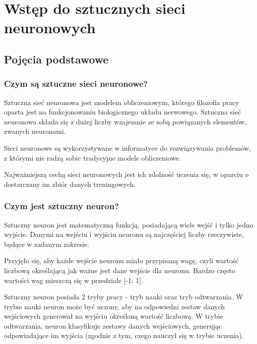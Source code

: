 \chapter{Wstęp do sztucznych sieci neuronowych}
\section{Pojęcia podstawowe}
\subsection{Czym są sztuczne sieci neuronowe?}
Sztuczna sieć neuronowa jest modelem obliczeniowym, którego filozofia pracy oparta jest na funkcjonowaniu biologicznego układu nerwowego.
Sztuczna sieć neuronowa składa się z dużej liczby wzajemnie ze sobą powiązanych elementów, zwanych neuronami.

Sieci neuronowe są wykorzystywane w informatyce do rozwiązywania problemów, z którymi nie radzą sobie tradycyjne modele obliczeniowe.

Najważniejszą cechą sieci neuronowych jest ich zdolność uczenia się, w oparciu o dostarczany im zbiór danych treningowych.

\subsection{Czym jest sztuczny neuron?}
Sztuczny neuron jest matematyczną funkcją, posiadającą wiele wejść i tylko jedno wyjście. Danymi na wejściu i wyjściu neuronu są najczęściej liczby rzeczywiste, będące  w zadanym zakresie.

Przyjęło się, aby każde wejście neuronu miało przypisaną wagę, czyli wartość liczbową określającą jak ważne jest dane wejście dla neuronu.
Bardzo często wartości wag mieszczą się w przedziale [-1; 1].

Sztuczny neuron posiada 2 tryby pracy - tryb nauki oraz tryb odtwarzania. \newline
W trybie nauki neuron może być uczony, aby na odpowiedni zestaw danych
wejściowych generował na wyjściu określoną wartość liczbową. \newline
W trybie odtwarzania, neuron klasyfikuje zestawy danych wejściowych, generując
odpowiadające im wyjścia (zgodnie z tym, czego nauczył się w trybie uczenia).

